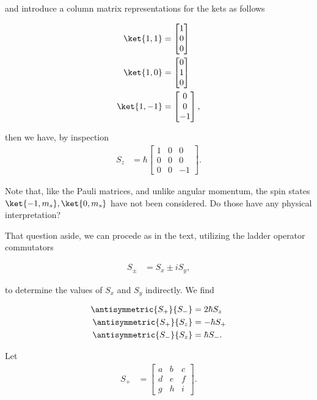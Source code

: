 and introduce a column matrix representations for the kets as follows

\begin{align}\label{eqn:desaiCh5:102}
\ket{1,1} &=
\begin{bmatrix}
1 \\
0 \\
0
\end{bmatrix} \\
\ket{1,0} &=
\begin{bmatrix}
0 \\
1 \\
0
\end{bmatrix} \\
\ket{1,-1} &=
\begin{bmatrix}
0 \\
0 \\
-1
\end{bmatrix},
\end{align}

then we have, by inspection
\begin{align}\label{eqn:desaiCh5:103}
S_z &= \hbar
\begin{bmatrix}
1 & 0 & 0 \\
0 & 0 & 0 \\
0 & 0 & -1
\end{bmatrix}.
\end{align}

Note that, like the Pauli matrices, and unlike angular momentum, the spin states $\ket{-1, m_s}, \ket{0, m_s}$ have not been considered.  Do those have any physical interpretation?

That question aside, we can procede as in the text, utilizing the ladder operator commutators

\begin{align}\label{eqn:desaiCh5:104}
S_{\pm} &= S_x \pm i S_y,
\end{align}

to determine the values of $S_x$ and $S_y$ indirectly.  We find

\begin{align}\label{eqn:desaiCh5:105}
\antisymmetric{S_{+}}{S_{-}} &= 2 \hbar S_z \\
\antisymmetric{S_{+}}{S_{z}} &= -\hbar S_{+} \\
\antisymmetric{S_{-}}{S_{z}} &= \hbar S_{-}.
\end{align}

Let
\begin{align}\label{eqn:desaiCh5:106}
S_{+} &=
\begin{bmatrix}
a & b & c \\
d & e & f \\
g & h & i
\end{bmatrix}.
\end{align}

